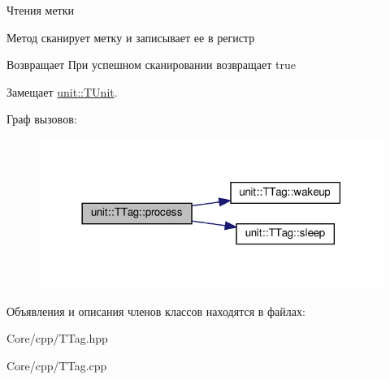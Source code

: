 Чтения метки 

Метод сканирует метку и записывает ее в регистр \begin{DoxyReturn}{Возвращает}
При успешном сканировании возвращает true 
\end{DoxyReturn}


Замещает \hyperlink{classunit_1_1_t_unit_a108691c8b988d97c65237c83a31db706}{unit\+::\+T\+Unit}.

Граф вызовов\+:\nopagebreak
\begin{figure}[H]
\begin{center}
\leavevmode
\includegraphics[width=318pt]{classunit_1_1_t_tag_a1dfd588909730d0b48edbeda273526fe_cgraph}
\end{center}
\end{figure}


Объявления и описания членов классов находятся в файлах\+:\begin{DoxyCompactItemize}
\item 
Core/cpp/T\+Tag.\+hpp\item 
Core/cpp/T\+Tag.\+cpp\end{DoxyCompactItemize}

